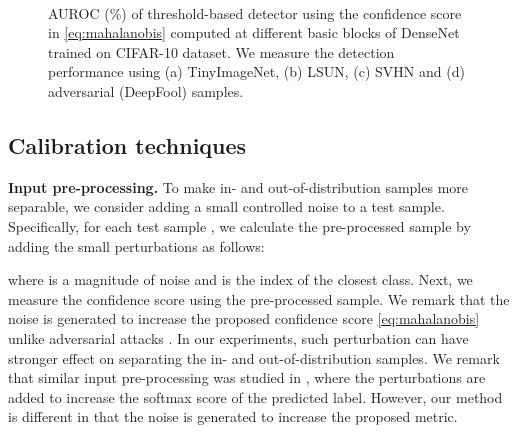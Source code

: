 \documentclass{article}
\begin{document}
\begin{figure} [t] \centering
{} 
\,
\,
\,
\caption{AUROC (\%) of threshold-based detector using the confidence score in \eqref{eq:mahalanobis} computed at different basic blocks of DenseNet trained on CIFAR-10 dataset. We measure the detection performance using (a) TinyImageNet, (b) LSUN, (c) SVHN and (d) adversarial (DeepFool) samples.}
\label{fig:low_layer_dense}
\end{figure}

\subsection{Calibration techniques}


{\bf Input pre-processing.}
To make in- and out-of-distribution samples more separable, we consider adding a small controlled noise to a test sample.
Specifically, for each test sample , we calculate the pre-processed sample  by adding the small perturbations as follows:

where  is a magnitude of noise and  is the index of the closest class.
Next, we measure the confidence score using the pre-processed sample.
We remark that the noise is generated to increase the proposed confidence score \eqref{eq:mahalanobis} unlike adversarial attacks \citep{goodfellow2014explaining}.
In our experiments,
such perturbation can have stronger effect on separating the in- and out-of-distribution samples.
We remark that similar input pre-processing was studied in \citep{liang2017principled}, where the perturbations are added to increase the softmax score of the predicted label.
However, our method is different in that the noise is generated to increase the proposed metric.
\end{document}
